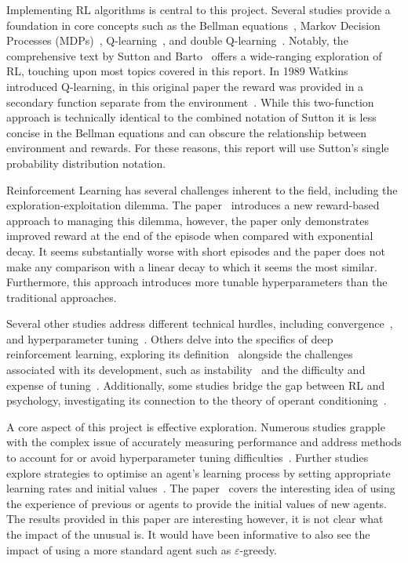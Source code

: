 \documentclass[]{final_report}
\begin{document}
Implementing RL algorithms is central to this project. Several studies provide a foundation in core concepts such as the Bellman equations~\cite{bellman1957}, Markov Decision Processes (MDPs)~\cite{meyn2012markov,sutton2018reinforcement}, Q-learning~\cite{watkins1992q}, and double Q-learning~\cite{doubleQLearning}. Notably, the comprehensive text  by Sutton and Barto~\cite{sutton2018reinforcement} offers a wide-ranging exploration of RL, touching upon most topics covered in this report. In 1989 Watkins introduced Q-learning, in this original paper the reward was provided in a secondary function separate from the environment~\cite{watkins1992q}. While this two-function approach is technically identical to the combined notation of Sutton it is less concise in the Bellman equations and can obscure the relationship between environment and rewards. For these reasons, this report will use Sutton's single probability distribution notation.

Reinforcement Learning has several challenges inherent to the field, including the exploration-exploitation dilemma. The  paper~\cite{rewardEpsilonDecay} introduces a new reward-based approach to managing this dilemma, however, the paper only demonstrates improved reward at the end of the episode when compared with exponential decay. It seems substantially worse with short episodes and the paper does not make any comparison with a linear decay to which it seems the most similar. Furthermore, this approach introduces more tunable hyperparameters than the traditional approaches.

Several other studies address different technical hurdles, including convergence~\cite{watkins1992q, QlearningConvergance}, and hyperparameter tuning~\cite{deepRLChallanges, searchStrategies}. Others delve into the specifics of deep reinforcement learning, exploring its definition~\cite{deepRLOverview} alongside the challenges associated with its development, such as instability~\cite{deepOnVsOffPolicy,sutton2018reinforcement} and the difficulty and expense of tuning~\cite{deepRLChallanges, DeepRLCost}. Additionally, some studies bridge the gap between RL and psychology, investigating its connection to the theory of operant conditioning~\cite{shteingart2014reinforcement,staddon2003operant}.

A core aspect of this project is effective exploration. Numerous studies grapple with the complex issue of accurately measuring performance and address methods to account for or avoid hyperparameter tuning difficulties~\cite{assessingDeepRL, evaluatingRL, parameterFreeExploration}. Further studies explore strategies to optimise an agent's learning process by setting appropriate learning rates and initial values~\cite{even2003learning, deathTransfer,decayingLearningRates}. The  paper~\cite{deathTransfer} covers the interesting idea of using the experience of previous or  agents to provide the initial values of new agents. The results provided in this paper are interesting however, it is not clear what the impact of the unusual  is. It would have been informative to also see the impact of using a more standard agent such as $\varepsilon$-greedy.
\end{document}

